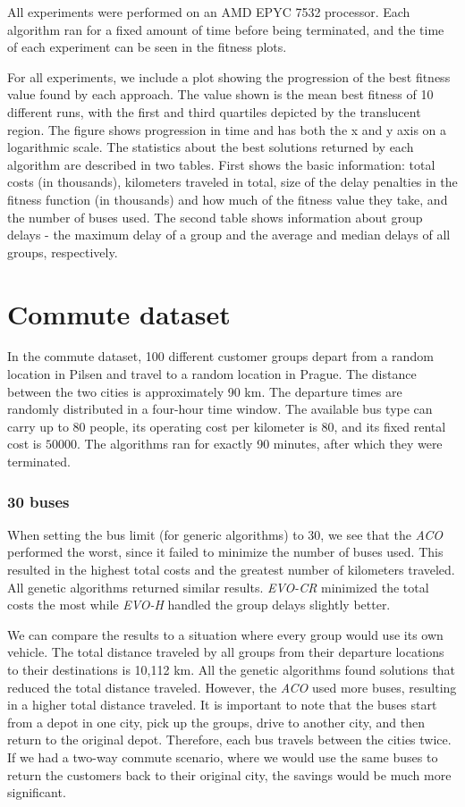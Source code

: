 All experiments were performed on an AMD EPYC 7532 processor. Each algorithm ran for a fixed amount of time before being terminated, and the time of each experiment can be seen in the fitness plots.

For all experiments, we include a plot showing the progression of the best fitness value found by each approach. The value shown is the mean best fitness of 10 different runs, with the first and third quartiles depicted by the translucent region. The figure shows progression in time and has both the x and y axis on a logarithmic scale. The statistics about the best solutions returned by each algorithm are described in two tables. First shows the basic information: total costs (in thousands), kilometers traveled in total, size of the delay penalties in the fitness function (in thousands) and how much of the fitness value they take, and the number of buses used. The second table shows information about group delays - the maximum delay of a group and the average and median delays of all groups, respectively.

\section{Commute dataset}

In the commute dataset, 100 different customer groups depart from a random location in Pilsen and travel to a random location in Prague. The distance between the two cities is approximately 90 km. The departure times are randomly distributed in a four-hour time window. \label{commute_bus_type}The available bus type can carry up to $80$ people, its operating cost per kilometer is $80$, and its fixed rental cost is $50000$. The algorithms ran for exactly 90 minutes, after which they were terminated.

\subsubsection{30 buses}

When setting the bus limit (for generic algorithms) to 30, we see that the \textit{ACO} performed the worst, since it failed to minimize the number of buses used. This resulted in the highest total costs and the greatest number of kilometers traveled. All genetic algorithms returned similar results. \textit{EVO-CR} minimized the total costs the most while \textit{EVO-H} handled the group delays slightly better.

We can compare the results to a situation where every group would use its own vehicle. The total distance traveled by all groups from their departure locations to their destinations is 10,112 km. All the genetic algorithms found solutions that reduced the total distance traveled. However, the \textit{ACO} used more buses, resulting in a higher total distance traveled. It is important to note that the buses start from a depot in one city, pick up the groups, drive to another city, and then return to the original depot. Therefore, each bus travels between the cities twice. If we had a two-way commute scenario, where we would use the same buses to return the customers back to their original city, the savings would be much more significant.

